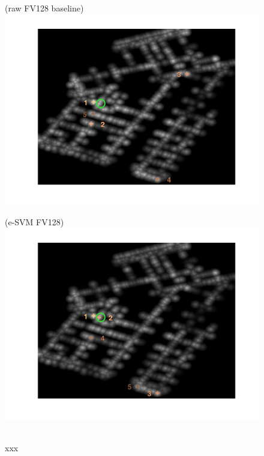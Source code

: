 \documentclass[10pt,onecolumn,A4]{article}
\begin{document}
\begin{figure}
	\begin{minipage}{0.45\linewidth}
		\center
		(raw FV128 baseline) \\
		\includegraphics[trim = 55mm 40mm 55mm 25mm, clip=true,width=\linewidth]{sup2961/heatRaw.jpg}
	\end{minipage} 
	\begin{minipage}{0.45\linewidth}
		\center
		(e-SVM FV128) \\
		\includegraphics[trim = 55mm 40mm 55mm 25mm, clip=true,width=\linewidth]{sup2961/heatSvm.jpg}
	\end{minipage} 
	\\
	\textcolor{myWhite}{xxx}\\

\end{figure}
\end{document}
